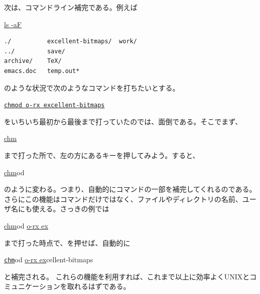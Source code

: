 次は、コマンドライン補完である。例えば
\begin{commandline2}
    \prompt \underline{ls -aF}
    \begin{verbatim}
./          excellent-bitmaps/  work/
../         save/
archive/    TeX/
emacs.doc   temp.out*
\end{verbatim}
\end{commandline2} \noindent
のような状況で次のようなコマンドを打ちたいとする。
\begin{commandline2}
    \prompt \underline{\texttt{chmod o-rx excellent-bitmaps}}
\end{commandline2} \noindent
をいちいち最初から最後まで打っていたのでは、面倒である。そこでまず、
\begin{commandline2}
    \prompt \underline{chm}
\end{commandline2} \noindent
まで打った所で、左の方にあるキーを押してみよう。すると、
\begin{commandline2}
    \prompt \underline{chm}od\ \cursor
\end{commandline2} \noindent
のように変わる。つまり、自動的にコマンドの一部を補完してくれるのである。さらにこの機能はコマンドだけではなく、ファイルやディレクトリの名前、ユーザ名にも使える。さっきの例では
\begin{commandline2}
    \prompt \underline{chm}od \underline{o-rx ex}
\end{commandline2} \noindent
まで打った時点で、を押せば、自動的に
\begin{commandline2}
    \prompt \underline{\texttt{chm}}od \underline{o-rx ex}cellent-bitmaps
\end{commandline2} \noindent
と補完される。
これらの機能を利用すれば、これまで以上に効率よくUNIXとコミュニケーションを取れるはずである。


